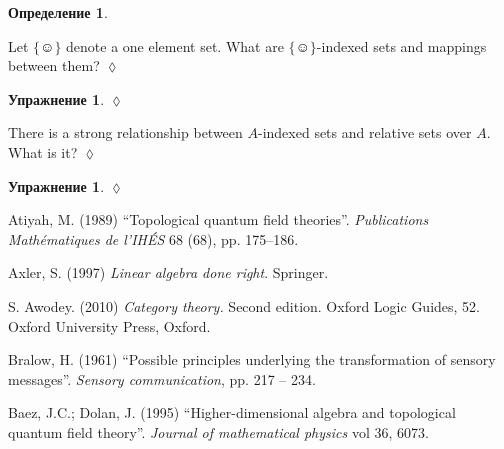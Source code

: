 \documentclass[a4paper]{book}
\def\singleton{\{\smiley\}}
\def\rr{\raggedright}
\theoremstyle{myth}
\newtheorem{excENG}[envENG]{\begin{english}Exercise\end{english}}
\newenvironment{exerciseENG}{\begin{excENG}}{\hspace*{\fill}$\lozenge$\end{excENG}}
\newtheorem{excRUS}[envRUS]{Упражнение}
\newtheorem{definitionRUS}[envRUS]{Определение}
\newenvironment{exerciseRUS}{\begin{excRUS}}{\hspace*{\fill}$\lozenge$\end{excRUS}}
\begin{document}
\begin{russian}
\begin{definitionRUS}\label{def:indexed sets}
 
\end{definitionRUS}

\begin{exerciseENG}
Let $\singleton$ denote a one element set. What are $\singleton$-indexed sets and mappings between them?
\end{exerciseENG}

\begin{exerciseRUS}
 
\end{exerciseRUS}

\begin{exerciseENG}
There is a strong relationship between $A$-indexed sets and relative sets over $A$. What is it?
\end{exerciseENG}

\begin{exerciseRUS}
 
\end{exerciseRUS}


\printendnotes


{}
\printindex



\begin{thebibliography}{SGWB}\rr
{}
{}

 Atiyah, M. (1989) “Topological quantum field theories”. {\em Publications Math\'{e}matiques de l'IH\'{E}S} 68 (68), pp. 175--186.

 Axler, S. (1997) {\em Linear algebra done right}. Springer. 

 S. Awodey. (2010) {\em Category theory.} Second edition. Oxford Logic Guides, 52. Oxford University Press, Oxford.

 Bralow, H. (1961) “Possible principles underlying the transformation of sensory messages”. {\em Sensory communication}, pp. 217 -- 234.

 Baez, J.C.; Dolan, J. (1995) “Higher-dimensional algebra and topological quantum field theory”. {\em Journal of mathematical physics} vol 36, 6073.


\end{thebibliography}
\end{russian}
\end{document}
